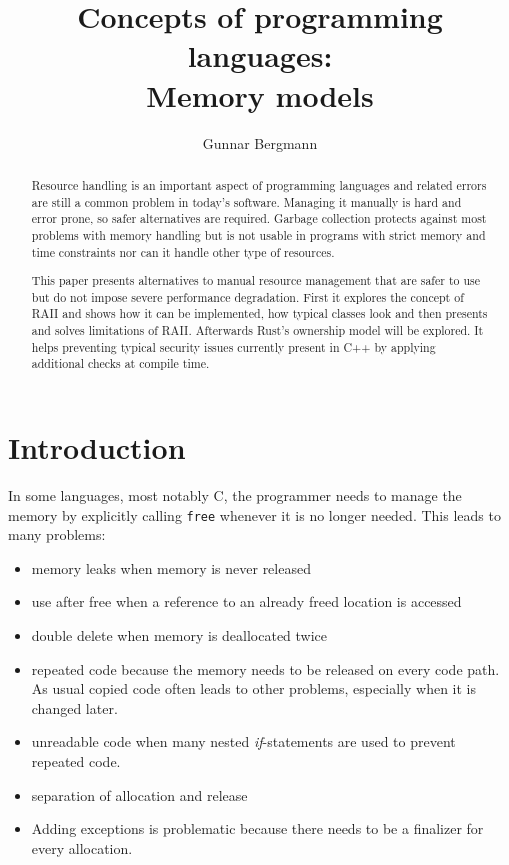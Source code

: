 \documentclass[conference,twocolumn]{IEEEtran}
\begin{document}
    

\title{Concepts of programming languages: \\ Memory models}
\author{Gunnar Bergmann}


\maketitle

\begin{abstract}
Resource handling is an important aspect of programming languages and related errors are still a common problem in today's software. Managing it manually is hard and error prone, so safer alternatives are required. Garbage collection protects against most problems with memory handling but is not usable in programs with strict memory and time constraints nor can it handle other type of resources.

This paper presents alternatives to manual resource management that are safer to use but do not impose severe performance degradation. First it explores the concept of RAII and shows how it can be implemented, how typical classes look and then presents and solves limitations of RAII. Afterwards Rust's ownership model will be explored. It helps preventing typical security issues currently present in C++ by applying additional checks at compile time.

\end{abstract}


\section{Introduction}

In some languages, most notably C, the programmer needs to manage the memory by explicitly calling \verb|free| whenever it is no longer needed.
This leads to many problems:
\begin{itemize}
    \item memory leaks when memory is never released
    \item use after free when a reference to an already freed location is accessed
    \item double delete when memory is deallocated twice
    \item repeated code because the memory needs to be released on every code path. As usual copied code often leads to other problems, especially when it is changed later.
    \item unreadable code when many nested \emph{if}-statements are used to prevent repeated code.
    \item separation of allocation and release
    \item Adding exceptions is problematic because there needs to be a finalizer for every allocation.
\end{itemize}
\end{document}
